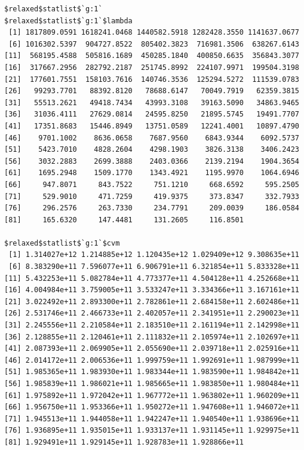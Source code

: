 \documentclass[
]{article}
\begin{document}
\begin{verbatim}
$relaxed$statlist$`g:1`
$relaxed$statlist$`g:1`$lambda
 [1] 1817809.0591 1618241.0468 1440582.5918 1282428.3550 1141637.0677
 [6] 1016302.5397  904727.8522  805402.3823  716981.3506  638267.6143
[11]  568195.4588  505816.1689  450285.1840  400850.6635  356843.3077
[16]  317667.2956  282792.2187  251745.8992  224107.9971  199504.3198
[21]  177601.7551  158103.7616  140746.3536  125294.5272  111539.0783
[26]   99293.7701   88392.8120   78688.6147   70049.7919   62359.3815
[31]   55513.2621   49418.7434   43993.3108   39163.5090   34863.9465
[36]   31036.4111   27629.0814   24595.8250   21895.5745   19491.7707
[41]   17351.8683   15446.8949   13751.0589   12241.4001   10897.4790
[46]    9701.1002    8636.0658    7687.9560    6843.9344    6092.5737
[51]    5423.7010    4828.2604    4298.1903    3826.3138    3406.2423
[56]    3032.2883    2699.3888    2403.0366    2139.2194    1904.3654
[61]    1695.2948    1509.1770    1343.4921    1195.9970    1064.6946
[66]     947.8071     843.7522     751.1210     668.6592     595.2505
[71]     529.9010     471.7259     419.9375     373.8347     332.7933
[76]     296.2576     263.7330     234.7791     209.0039     186.0584
[81]     165.6320     147.4481     131.2605     116.8501

$relaxed$statlist$`g:1`$cvm
 [1] 1.314027e+12 1.214885e+12 1.120435e+12 1.029409e+12 9.308635e+11
 [6] 8.383290e+11 7.596077e+11 6.906791e+11 6.321854e+11 5.833328e+11
[11] 5.432253e+11 5.082784e+11 4.773377e+11 4.504128e+11 4.252668e+11
[16] 4.004984e+11 3.759005e+11 3.533247e+11 3.334366e+11 3.167161e+11
[21] 3.022492e+11 2.893300e+11 2.782861e+11 2.684158e+11 2.602486e+11
[26] 2.531746e+11 2.466733e+11 2.402057e+11 2.341951e+11 2.290023e+11
[31] 2.245556e+11 2.210584e+11 2.183510e+11 2.161194e+11 2.142998e+11
[36] 2.128855e+11 2.120461e+11 2.111832e+11 2.105974e+11 2.102697e+11
[41] 2.087393e+11 2.069905e+11 2.055690e+11 2.039718e+11 2.025916e+11
[46] 2.014172e+11 2.006536e+11 1.999759e+11 1.992691e+11 1.987999e+11
[51] 1.985365e+11 1.983930e+11 1.983344e+11 1.983590e+11 1.984842e+11
[56] 1.985839e+11 1.986021e+11 1.985665e+11 1.983850e+11 1.980484e+11
[61] 1.975892e+11 1.972042e+11 1.967772e+11 1.963802e+11 1.960209e+11
[66] 1.956750e+11 1.953366e+11 1.950272e+11 1.947608e+11 1.946072e+11
[71] 1.945513e+11 1.944058e+11 1.942247e+11 1.940540e+11 1.938696e+11
[76] 1.936895e+11 1.935015e+11 1.933137e+11 1.931145e+11 1.929975e+11
[81] 1.929491e+11 1.929145e+11 1.928783e+11 1.928866e+11


\end{verbatim}
\end{document}
